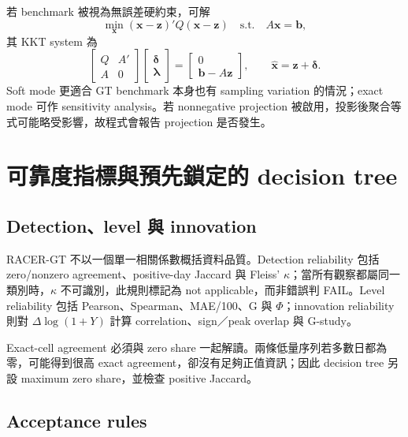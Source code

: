 \documentclass[12pt,a4paper,oneside]{article}
\begin{document}
若 benchmark 被視為無誤差硬約束，可解
\begin{equation}
\min_{\bm x}(\bm x-\bm z)'Q(\bm x-\bm z)
\quad\text{s.t.}\quad A\bm x=\bm b,
\end{equation}
其 KKT system 為
\begin{equation}
\begin{bmatrix}
Q&A'\\A&0
\end{bmatrix}
\begin{bmatrix}\bm\delta\\\bm\lambda\end{bmatrix}
=
\begin{bmatrix}0\\\bm b-A\bm z\end{bmatrix},
\qquad \widehat{\bm x}=\bm z+\bm\delta.
\end{equation}
Soft mode 更適合 GT benchmark 本身也有 sampling variation 的情況；exact mode 可作 sensitivity analysis。若 nonnegative projection 被啟用，投影後聚合等式可能略受影響，故程式會報告 projection 是否發生。

\section{可靠度指標與預先鎖定的 decision tree}

\subsection{Detection、level 與 innovation}

RACER-GT 不以一個單一相關係數概括資料品質。Detection reliability 包括 zero/nonzero agreement、positive-day Jaccard 與 Fleiss' $\kappa$；當所有觀察都屬同一類別時，$\kappa$ 不可識別，此規則標記為 not applicable，而非錯誤判 FAIL。Level reliability 包括 Pearson、Spearman、MAE/100、G 與 $\Phi$；innovation reliability 則對 $\Delta\log(1+Y)$ 計算 correlation、sign／peak overlap 與 G-study。

Exact-cell agreement 必須與 zero share 一起解讀。兩條低量序列若多數日都為零，可能得到很高 exact agreement，卻沒有足夠正值資訊；因此 decision tree 另設 maximum zero share，並檢查 positive Jaccard。

\subsection{Acceptance rules}
\end{document}
